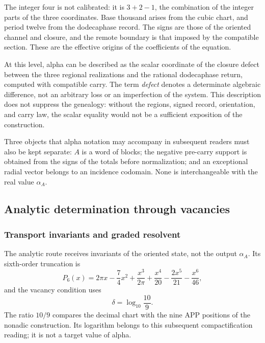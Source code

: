 The integer four is not calibrated: it is
\(3+2-1\), the combination of the integer parts of the three coordinates.
Base thousand arises from the cubic chart, and period twelve from the dodecaphase record.
The signs are those of the oriented channel and closure, and the remote boundary is
that imposed by the compatible section. These are the effective origins of
the coefficients of the equation.

At this level, alpha can be described as the scalar coordinate of the
closure defect between the three regional realizations and the
rational dodecaphase return, computed with compatible carry. The term
\emph{defect} denotes a determinate algebraic difference, not an
arbitrary loss or an imperfection of the system. This description does not
suppress the genealogy: without the regions, signed record,
orientation, and carry law, the scalar equality would not be a
sufficient exposition of the construction.

Three objects that alpha notation may accompany in subsequent readers
must also be kept separate: \(A\) is a word of
blocks; the negative pre-carry support is obtained from the signs of the
totals before normalization; and an exceptional radial vector belongs to
an incidence codomain. None is interchangeable with the
real value \(\alpha_A\).






\subsection{Analytic determination through vacancies}
\subsubsection{Transport invariants and graded resolvent}
\label{subsec:alpha-via-b}

The analytic route receives invariants of the oriented state, not the output
\(\alpha_A\). Its sixth-order truncation is
\begin{equation}
 P_6(x)=2\pi x-\frac74x^2
 +\frac{x^3}{2\pi}
 +\frac{x^4}{20}-\frac{2x^5}{21}-\frac{x^6}{46},
 \label{eq:alpha-p6}
\end{equation}
and the vacancy condition uses
\[
 \delta=\log_{10}\frac{10}{9}.
\]
The ratio \(10/9\) compares the decimal chart with the nine APP
positions of the nonadic construction. Its logarithm belongs to this subsequent
compactification reading; it is not a target value of alpha.

